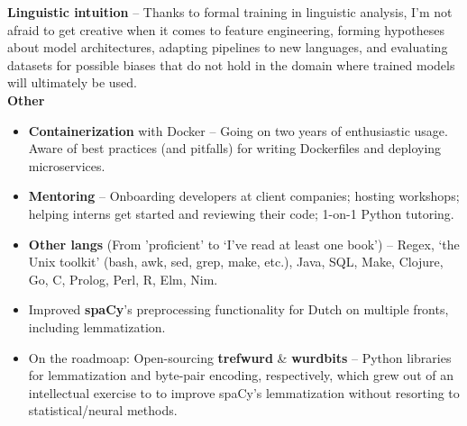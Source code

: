 \documentclass[9pt]{developercv} %
\begin{document}
\textbf{Linguistic intuition} -- Thanks to formal training in linguistic
analysis, I'm not afraid to get creative when it comes to feature engineering,
forming hypotheses about model architectures, adapting pipelines to new languages,
and evaluating datasets for possible biases that do not hold in the domain
where trained models will ultimately be used.\\

\textbf{Other}
\begin{itemize}[leftmargin=*]
    \setlength\itemsep{-2pt}

\item \textbf{Containerization} with Docker -- Going on two years of
    enthusiastic usage. Aware of best practices (and pitfalls) for writing
    Dockerfiles and deploying microservices.

\item \textbf{Mentoring} -- Onboarding developers at client companies; hosting
    workshops; helping interns get started and reviewing their code; 1-on-1
    Python tutoring.

\item \textbf{Other langs} (From 'proficient' to `I've read at least one book')
    -- Regex, `the Unix toolkit' (bash, awk, sed, grep, make, etc.), Java, SQL,
    Make, Clojure, Go, C, Prolog, Perl, R, Elm, Nim.  \end{itemize}

\vspace{-1em}
\begin{itemize}[leftmargin=*]
    \setlength\itemsep{-2pt}
    \item Improved \textbf{spaCy}'s preprocessing functionality for Dutch
        on multiple fronts, including lemmatization.
    \item On the roadmoap: Open-sourcing \textbf{trefwurd} \& \textbf{wurdbits} 
        -- Python libraries for
        lemmatization and byte-pair encoding, respectively, which grew out of
        an intellectual exercise to to improve spaCy's lemmatization without
        resorting to statistical/neural methods.
\end{itemize}


\end{document}
